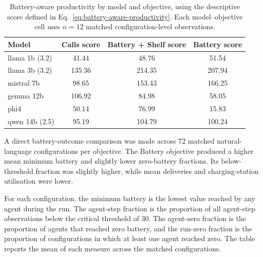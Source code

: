 \begin{table}[H]
\centering
\small
\begin{tabular}{|l|c|c|c|}
\hline
\textbf{Model} & \textbf{Calls score} & \textbf{Battery + Shelf score} & \textbf{Battery score} \\ \hline
llama 1b (3.2) & 41.44 & 48.76 & 51.54 \\ \hline
llama 3b (3.2) & 135.36 & 214.35 & 207.94 \\ \hline
mistral 7b & 98.65 & 153.43 & 166.25 \\ \hline
gemma 12b & 106.92 & 84.98 & 58.05 \\ \hline
phi4 & 50.14 & 76.99 & 15.83 \\ \hline
qwen 14b (2.5) & 95.19 & 104.79 & 100.24 \\ \hline
\end{tabular}
\caption{Battery-aware productivity by model and objective, using the descriptive score defined in Eq.~\ref{eq:battery-aware-productivity}. Each model--objective cell uses $n=12$ matched configuration-level observations.}
\label{tab:battery_aware_productivity}
\end{table}

A direct battery-outcome comparison was made across 72 matched natural-language configurations per objective. The Battery objective produced a higher mean minimum battery and slightly lower zero-battery fractions. Its below-threshold fraction was slightly higher, while mean deliveries and charging-station utilisation were lower.

For each configuration, the minimum battery is the lowest value reached by any agent during the run. The agent-step fraction is the proportion of all agent-step observations below the critical threshold of 30. The agent-zero fraction is the proportion of agents that reached zero battery, and the run-zero fraction is the proportion of configurations in which at least one agent reached zero. The table reports the mean of each measure across the matched configurations.

\begin{table}[H]
\centering
\small
{}
\caption{Direct battery outcomes across matched Battery and Battery + Shelf configurations. Repeated runs are averaged before each configuration receives equal weight.}
\label{tab:direct_battery_outcomes}
\end{table}

